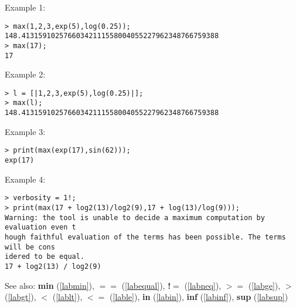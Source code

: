 \noindent Example 1: 
\begin{center}\begin{minipage}{15cm}\begin{Verbatim}[frame=single,commandchars=\\\|\~]
> max(1,2,3,exp(5),log(0.25));
148.41315910257660342111558004055227962348766759388
> max(17);
17
\end{Verbatim}
\end{minipage}\end{center}
\noindent Example 2: 
\begin{center}\begin{minipage}{15cm}\begin{Verbatim}[frame=single,commandchars=\\\|\~]
> l = [|1,2,3,exp(5),log(0.25)|];
> max(l);
148.41315910257660342111558004055227962348766759388
\end{Verbatim}
\end{minipage}\end{center}
\noindent Example 3: 
\begin{center}\begin{minipage}{15cm}\begin{Verbatim}[frame=single,commandchars=\\\|\~]
> print(max(exp(17),sin(62)));
exp(17)
\end{Verbatim}
\end{minipage}\end{center}
\noindent Example 4: 
\begin{center}\begin{minipage}{15cm}\begin{Verbatim}[frame=single,commandchars=\\\|\~]
> verbosity = 1!;
> print(max(17 + log2(13)/log2(9),17 + log(13)/log(9)));
Warning: the tool is unable to decide a maximum computation by evaluation even t
hough faithful evaluation of the terms has been possible. The terms will be cons
idered to be equal.
17 + log2(13) / log2(9)
\end{Verbatim}
\end{minipage}\end{center}
See also: \textbf{min} (\ref{labmin}), \textbf{$==$} (\ref{labequal}), \textbf{!$=$} (\ref{labneq}), \textbf{$>=$} (\ref{labge}), \textbf{$>$} (\ref{labgt}), \textbf{$<$} (\ref{lablt}), \textbf{$<=$} (\ref{lable}), \textbf{in} (\ref{labin}), \textbf{inf} (\ref{labinf}), \textbf{sup} (\ref{labsup})
